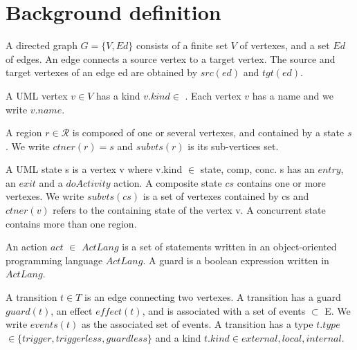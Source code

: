 \section{Background definition}
\label{subsec:background}

\begin{definition}A directed graph $G = \{V, Ed\}$ consists of a finite set $V$ of vertexes, and a set $Ed$ of edges. An edge connects a source vertex to a target vertex. The source and target vertexes of an edge ed are obtained by $src(ed)$ and $tgt(ed)$.
\end{definition}

\begin{definition}A UML vertex $v \in V$ has a kind $v.kind \in$  . Each vertex $v$ has a name and we write $v.name$. 
\end{definition} 

\begin{definition}A region $r \in \mathcal{R}$ is composed of one or several vertexes, and contained by a state $s$. We write $ctner(r) = s$ and $subvts(r)$ is its sub-vertices set. 
\end{definition}	

\begin{definition} A UML state s is a vertex v where v.kind $\in$ {state, comp, conc}. s has an $entry$, an $exit$ and a $doActivity$ action. A composite state $cs$ contains one or more vertexes. We write $subvts(cs)$ is a set of vertexes contained by cs and $ctner(v)$ refers to the containing state of the vertex v. A concurrent state contains more than one region.
\end{definition}		

\begin{definition} An action $act$ $\in$ $ActLang$ is a set of statements written in an object-oriented programming language $ActLang$. A guard is a boolean expression written in $ActLang$.
\end{definition}

\begin{definition} A transition $t \in T$ is an edge connecting two vertexes. A transition has a guard $guard(t)$, an effect $effect(t)$, and is associated with a set of events $\subset$ E. We write $events(t)$ as the associated set of events. A transition has a type $t.type$ $\in \{trigger, triggerless, guardless\}$ and a kind $t.kind \in {external, local, internal}$.
\end{definition}

